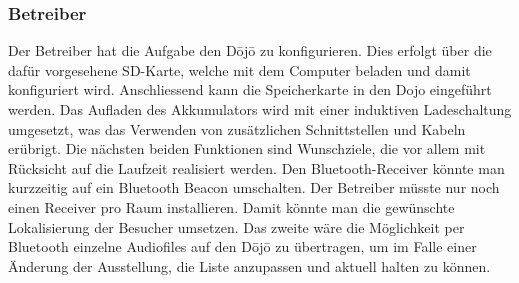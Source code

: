 \subsubsection*{Betreiber} \label{sec:funktionBetreiber}
Der Betreiber hat die Aufgabe den Dōjō zu konfigurieren. Dies erfolgt über die dafür vorgesehene SD-Karte, welche mit dem Computer beladen und damit konfiguriert wird. Anschliessend kann die Speicherkarte in den Dojo eingeführt werden. Das Aufladen des Akkumulators wird mit einer induktiven Ladeschaltung umgesetzt, was das Verwenden von zusätzlichen Schnittstellen und Kabeln erübrigt. Die nächsten beiden Funktionen sind Wunschziele, die vor allem mit Rücksicht auf die Laufzeit realisiert werden. Den Bluetooth-Receiver könnte man kurzzeitig auf ein Bluetooth Beacon umschalten. Der Betreiber müsste nur noch einen Receiver pro Raum installieren. Damit könnte man die gewünschte Lokalisierung der Besucher umsetzen. Das zweite wäre die Möglichkeit per Bluetooth einzelne Audiofiles auf den Dōjō zu übertragen, um im Falle einer Änderung der Ausstellung, die Liste anzupassen und aktuell halten zu können.
